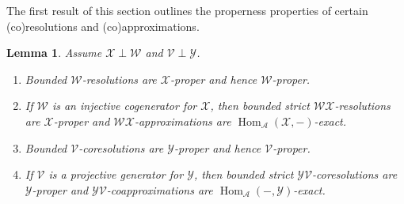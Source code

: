 \documentclass{amsart}
\newtheorem{lem}{Lemma}[section]
\begin{document}
The first result of this section outlines the properness properties of 
certain (co)resolutions and (co)approximations.

\begin{lem} \label{xhat}
Assume ${{\mathcal{{X}}}}\perp{{\mathcal{{W}}}}$ and ${{\mathcal{{V}}}}\perp{{\mathcal{{Y}}}}$.
\begin{enumerate}[\quad\rm(a)]
\item \label{xhatitem01}
Bounded ${{\mathcal{{W}}}}$-resolutions are ${{\mathcal{{X}}}}$-proper and hence ${{\mathcal{{W}}}}$-proper.
\item \label{xhatitem02}
If ${{\mathcal{{W}}}}$ is an injective cogenerator for ${{\mathcal{{X}}}}$, then 
bounded strict ${{\mathcal{{W}}}}{{\mathcal{{X}}}}$-resolutions
are ${{\mathcal{{X}}}}$-proper and ${{\mathcal{{W}}}}{{\mathcal{{X}}}}$-approximations are
${{\operatorname{Hom}}_{{\mathcal{{A}}}}}({{\mathcal{{X}}}},-)$-exact.
\item \label{xhatitem03}
Bounded ${{\mathcal{{V}}}}$-coresolutions are ${{\mathcal{{Y}}}}$-proper and hence ${{\mathcal{{V}}}}$-proper.
\item \label{xhatitem04}
If ${{\mathcal{{V}}}}$ is a projective generator for ${{\mathcal{{Y}}}}$, then 
bounded strict ${{\mathcal{{Y}}}}{{\mathcal{{V}}}}$-coresolutions
are ${{\mathcal{{Y}}}}$-proper and ${{\mathcal{{Y}}}}{{\mathcal{{V}}}}$-coapproximations are
${{\operatorname{Hom}}_{{\mathcal{{A}}}}}(-,{{\mathcal{{Y}}}})$-exact.
\end{enumerate}
\end{lem}
\end{document}
